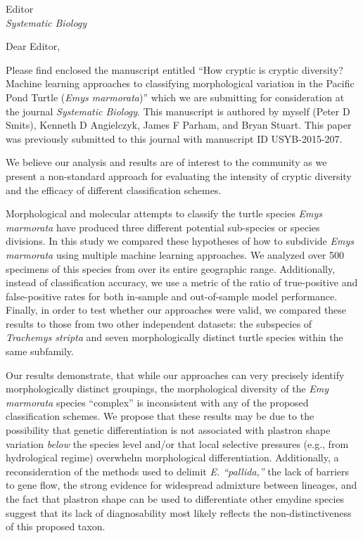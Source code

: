 \documentclass{letter}
\begin{document}
\begin{letter}{Editor \\ \textit{Systematic Biology}}
  \opening{Dear Editor,}

  Please find enclosed the manuscript entitled ``How cryptic is cryptic diversity? Machine learning approaches to classifying morphological variation in the Pacific Pond Turtle (\textit{Emys marmorata})'' which we are submitting for consideration at the journal \textit{Systematic Biology}. This manuscript is authored by myself (Peter D Smits), Kenneth D Angielczyk, James F Parham, and Bryan Stuart. This paper was previously submitted to this journal with manuscript ID USYB-2015-207.

  We believe our analysis and results are of interest to the community as we present a non-standard approach for evaluating the intensity of cryptic diversity and the efficacy of different classification schemes.

  Morphological and molecular attempts to classify the turtle species \textit{Emys marmorata} have produced three different potential sub-species or species divisions. In this study we compared these hypotheses of how to subdivide \textit{Emys marmorata} using multiple machine learning approaches. We analyzed over 500 specimens of this species from over its entire geographic range. Additionally, instead of classification accuracy, we use a metric of the ratio of true-positive and false-positive rates for both in-sample and out-of-sample model performance. Finally, in order to test whether our approaches were valid, we compared these results to those from two other independent datasets: the subspecies of \textit{Trachemys stripta} and seven morphologically distinct turtle species within the same subfamily.


  Our results demonstrate, that while our approaches can very precisely identify morphologically distinct groupings, the morphological diversity of the \textit{Emy marmorata} species ``complex'' is inconsistent with any of the proposed classification schemes. We propose that these results may be due to the possibility that genetic differentiation is not associated with plastron shape variation \textit{below} the species level and/or that local selective pressures (e.g., from hydrological regime) overwhelm morphological differentiation. Additionally, a reconsideration of the methods used to delimit \textit{E. ``pallida,''} the lack of barriers to gene flow, the strong evidence for widespread admixture between lineages, and the fact that plastron shape can be used to differentiate other emydine species suggest that its lack of diagnosability most likely reflects the non-distinctiveness of this proposed taxon.


\end{letter}
\end{document}
